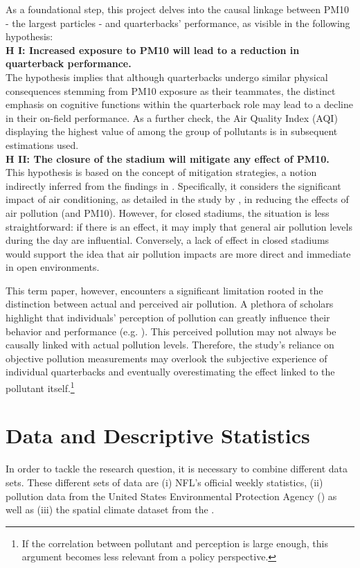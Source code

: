 \documentclass[12pt,a4paper]{article}
\begin{document}
As a foundational step, this project delves into the causal linkage between PM10 - the largest particles - and quarterbacks' performance, as visible in the following hypothesis: \\[0.2cm]
\textbf{H I: Increased exposure to PM10 will lead to a reduction in quarterback performance. } \\[0.2cm]
The hypothesis implies that although quarterbacks undergo similar physical consequences stemming from PM10 exposure as their teammates, the distinct emphasis on cognitive functions within the quarterback role may lead to a decline in their on-field performance. As a further check, the Air Quality Index (AQI) displaying the highest value of among the group of pollutants is in subsequent estimations used. \\[0.2cm]
\textbf{H II: The closure of the stadium will mitigate any effect of PM10.} \\[0.2cm]
This hypothesis is based on the concept of mitigation strategies, a notion indirectly inferred from the findings in \citet{deschenes2017}. Specifically, it considers the significant impact of air conditioning, as detailed in the study by \citet{lin2013}, in reducing the effects of air pollution (and PM10). However, for closed stadiums, the situation is less straightforward: if there is an effect, it may imply that general air pollution levels during the day are influential. Conversely, a lack of effect in closed stadiums would support the idea that air pollution impacts are more direct and immediate in open environments.

This term paper, however, encounters a significant limitation rooted in the distinction between actual and perceived air pollution. A plethora of scholars highlight that individuals' perception of pollution can greatly influence their behavior and performance (e.g. \citealp{rehdanz2008,schumacher2008,mackerron2009,chiarini2020,gong2020,claeson2013}). This perceived pollution may not always be causally linked with actual pollution levels. Therefore, the study's reliance on objective pollution measurements may overlook the subjective experience of individual quarterbacks and eventually overestimating the effect linked to the pollutant itself.\footnote{If the correlation between pollutant and perception is large enough, this argument becomes less relevant from a policy perspective.}

\clearpage

\section{Data and Descriptive Statistics}
\label{3}
In order to tackle the research question, it is necessary to combine different data sets. These different sets of data are (i) NFL's official weekly statistics, (ii) pollution data from the United States Environmental Protection Agency (\citeauthor{EPA}) as well as (iii) the spatial climate dataset from the \citeauthor{PRISM}. 
\end{document}
